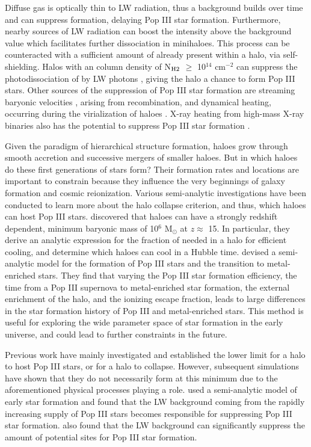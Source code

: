 \documentclass[fleqn,usenatbib]{mnras}
\begin{document}
Diffuse gas is optically thin to LW radiation, thus a background builds over time and can suppress \hh{} formation, delaying Pop III star formation. Furthermore, nearby sources of LW radiation can boost the intensity above the background value which facilitates further \hh{} dissociation in minihaloes. This process can be counteracted with a sufficient amount of \hh{} already present within a halo, via \hh{} self-shielding. Halos with an \hh{} column density of N$_{\rm H2}$ $\geq$ 10$^{14}$ cm$^{-2}$ can suppress the photodissociation of \hh{} by LW photons \citep{Draine96}, giving the halo a chance to form Pop III stars. Other sources of the suppression of Pop III star formation are streaming baryonic velocities \citep{Tselia11, Greif11_Delay, Naoz12, OLeary12, Schauer19, Hirano17_Science}, arising from recombination, and dynamical heating, occurring during the virialization of haloes \citep{Yoshida03, Fernandez14}. X-ray heating from high-mass X-ray binaries also has the potential to suppress Pop III star formation \citep{Jeon14}. 

Given the paradigm of hierarchical structure formation, haloes grow through smooth accretion and successive mergers of smaller haloes. But in which haloes do these first generations of stars form? Their formation rates and locations are important to constrain because they influence the very beginnings of galaxy formation and cosmic reionization. Various semi-analytic investigations have been conducted to learn more about the halo collapse criterion, and thus, which haloes can host Pop III stars. \citet{Tegmark97} discovered that haloes can have a strongly redshift dependent, minimum baryonic mass of 10$^{6}$ M$_{\odot}$ at $z \approx$ 15. In particular, they derive an analytic expression for the fraction of \hh{} needed in a halo for efficient cooling, and determine which  haloes can cool in a Hubble time. \citet{Visbal18} devised a semi-analytic model for the formation of Pop III stars and the transition to metal-enriched stars. They find that varying the Pop III star formation efficiency, the time from a Pop III supernova to metal-enriched star formation, the external enrichment of the halo, and the ionizing escape fraction, leads to large differences in the star formation history of Pop III and metal-enriched stars. This method is useful for exploring the wide parameter space of star formation in the early universe, and could lead to further constraints in the future. 

Previous work have mainly investigated and established the lower limit for a halo to host Pop III stars, or for a halo to collapse. However, subsequent simulations have shown that they do not necessarily form at this minimum due to the aforementioned physical processes playing a role. \citet{Mebane18} used a semi-analytic model of early star formation and found that the LW background coming from the rapidly increasing supply of Pop III stars becomes responsible for suppressing Pop III star formation. \citet{Griffen18} also found that the LW background can significantly suppress the amount of potential sites for Pop III star formation. 
\end{document}
